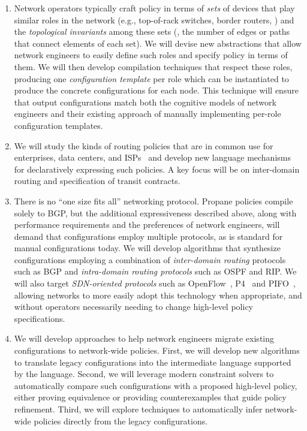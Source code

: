 \begin{enumerate}

\item Network operators typically craft policy in terms of \emph{sets} of devices that
play similar roles in the network (e.g., top-of-rack switches, border routers, \etc) and the  \emph{topological invariants} among these sets (\eg, the number of edges or paths that connect elements of each set).  We will devise new abstractions that allow network engineers to easily define such roles and specify policy in terms of them.  We will then develop compilation techniques that respect these roles, producing one {\em configuration template} per role which can be instantiated to produce the concrete configurations for each node.  This technique will ensure that output configurations match both the cognitive models of network engineers and their existing approach of manually implementing per-role configuration templates.

\item We will study the kinds of routing policies that are in common use for enterprises, data centers, and ISPs~\cite{routingplaybook} and develop new language mechanisms for declaratively expressing such policies.  A key focus will be on inter-domain routing and specification of transit contracts.


\item There is no ``one size fits all'' networking protocol. Propane policies compile solely to BGP, but the additional expressiveness described above, along with performance requirements and the preferences of network engineers, will demand that configurations employ multiple protocols, as is standard for manual configurations today.  We will develop algorithms that synthesize configurations employing a combination of \emph{inter-domain routing} protocols such as BGP and \emph{intra-domain routing protocols} such as OSPF and RIP.  We will also target
\emph{SDN-oriented protocols} such as OpenFlow~\cite{openflow}, P4~\cite{P4} and PIFO~\cite{pifo}, allowing networks to more easily adopt this technology when appropriate, and 
without operators necessarily needing to change high-level policy specifications.

\item We will develop approaches to help network engineers migrate existing configurations to network-wide policies.  First, we will develop new algorithms to translate legacy configurations into the intermediate language supported by the \Name language.  Second, we will leverage modern constraint solvers to automatically compare such configurations with a proposed high-level policy, either proving equivalence or providing counterexamples that guide policy refinement.  Third, we will explore techniques to automatically infer network-wide policies directly from the legacy configurations.


\end{enumerate}
